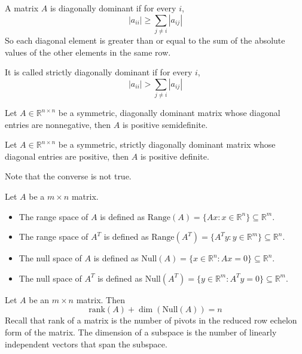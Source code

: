 \begin{definition}
  A matrix $A$ is diagonally dominant if for every $i$, $$|a_{ii}| \geq \sum_{j \neq i} |a_{ij}|$$
  So each diagonal element is greater than or equal to the sum of the absolute values of the other elements in the same row.

  It is called strictly diagonally dominant if for every $i$, $$|a_{ii}| > \sum_{j \neq i} |a_{ij}|$$
\end{definition}
\begin{proposition}
  Let $A \in \mathbb R^{n \times n}$ be a symmetric, diagonally dominant matrix whose diagonal entries are nonnegative, then $A$ is positive semidefinite.

  \bigskip
  Let $A \in \mathbb R^{n \times n}$ be a symmetric, strictly diagonally dominant matrix whose diagonal entries are positive, then $A$ is positive definite.

  \bigskip
  Note that the converse is not true.
\end{proposition}
\begin{definition}
  Let $A$ be a $m \times n$ matrix.
  \begin{itemize}
    \item The range space of $A$ is defined as $\text{Range}(A) = \{Ax: x \in \mathbb R^n\} \subseteq \mathbb R^m$.
    \item The range space of $A^T$ is defined as $\text{Range}(A^T) = \{A^T y: y \in \mathbb R^m\} \subseteq \mathbb R^n$.
    \item The null space of $A$ is defined as $\text{Null}(A) = \{x \in \mathbb R^n: Ax = 0\} \subseteq \mathbb R^n$.
    \item The null space of $A^T$ is defined as $\text{Null}(A^T) = \{y \in \mathbb R^m: A^T y = 0\} \subseteq \mathbb R^m$.
  \end{itemize}
\end{definition}
\begin{theorem}
  Let $A$ be an $m \times n$ matrix. Then
  $$\text{rank}(A) + \dim(\text{Null}(A)) = n$$
  Recall that rank of a matrix is the number of pivots in the reduced row echelon form of the matrix. The dimension of a subspace is the number of linearly independent vectors that span the subspace.
\end{theorem}